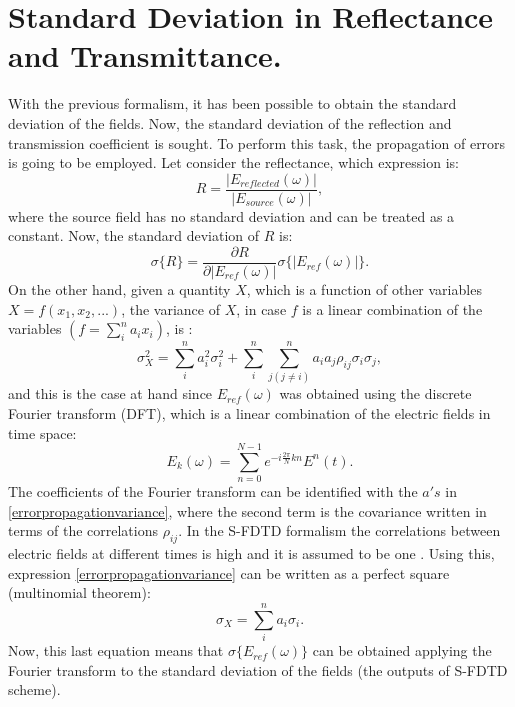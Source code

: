 \documentclass[12pt, oneside]{book}
\begin{document}
\section{Standard Deviation in Reflectance and Transmittance.}\label{stdRsection}
With the previous formalism, it has been possible to obtain the standard deviation of the fields. Now, the standard deviation of the reflection and transmission coefficient is sought. To perform this task, the propagation of errors is going to be employed. Let consider the reflectance, which expression is:
\begin{equation}
R=\frac{|E_{reflected}(\omega)|}{|E_{source}(\omega)|} ,
\end{equation}
where the source field has no standard deviation and can be treated as a constant. Now, the standard deviation of $R$ is:
\begin{equation}\label{sigmaR1}
\sigma\{R\}= \frac{\partial R}{\partial |E_{ref}(\omega)|} \sigma\{|E_{ref}(\omega)|\}.
\end{equation}
\indent On the other hand, given a quantity $X$, which is a function of other variables $X=f(x_1,x_2,...)$, the variance of $X$, in case $f$ is a linear combination of the variables $\left( f= \sum_i^n a_i x_i \right)$, is \cite{taylor1997introduction}: 
\begin{equation}\label{errorpropagationvariance}
\sigma_X ^2 = \sum_i ^n a_i^2 \sigma_i^2 + \sum_i^n \sum_{j(j\neq i)} ^n a_i a_j \rho_{ij} \sigma_i \sigma_j,
\end{equation}
and this is the case at hand since $E_{ref}(\omega)$ was obtained using the discrete Fourier transform (DFT), which is a linear combination of the electric fields in time space:
\begin{equation}
E_k(\omega)=\sum_{n=0}^{N-1} e^{-i\frac{2\pi}{N} k n} E^n(t).
\end{equation} 
The coefficients of the Fourier transform can be identified with the $a's$ in \ref{errorpropagationvariance}, where the second term is the covariance written in terms of the correlations $\rho_{ij}$. In the S-FDTD formalism the correlations between electric fields at different times is high and it is assumed to be one \cite{smith2011stochastic}. Using this, expression \ref{errorpropagationvariance} can be written as a perfect square (multinomial theorem):
\begin{equation}
\sigma_X=\sum_i ^n a_i \sigma_i.
\end{equation}
Now, this last equation means that $\sigma\{E_{ref}(\omega)\}$ can be obtained applying the Fourier transform to the standard deviation of the fields (the outputs of S-FDTD scheme). \\
\end{document}
